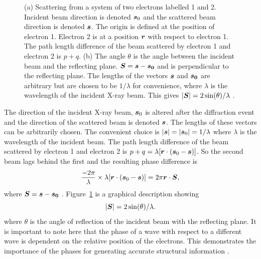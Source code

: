 \begin{figure}
\begin{subfigure}[b]{0.45\textwidth}
                        \caption{}
                        \label{fig:scattering vector}
                \end{subfigure}
                \caption[X-ray scattering from two electrons.]{(a) Scattering from a system of two electrons labelled 1 and 2. Incident beam direction is denoted $\boldsymbol{s}_0$ and the scattered beam direction is denoted $\boldsymbol{s}$.
                The origin is defined at the position of electron 1. Electron 2 is at a position $\boldsymbol{r}$ with respect to electron 1.
                The path length difference of the beam scattered by electron 1 and electron 2 is $p + q$.
                (b) The angle $\theta$ is the angle between the incident beam and the reflecting plane.
                $\boldsymbol{S} = \boldsymbol{s} - \boldsymbol{s_0}$ and is perpendicular to the reflecting plane.
                The lengths of the vectors $\boldsymbol{s}$ and $\boldsymbol{s_0}$ are arbitrary but are chosen to be $1/\lambda$ for convenience, where $\lambda$ is the wavelength of the incident X-ray beam.
                This gives $|\boldsymbol{S}| = 2 \sin(\theta)/\lambda$ \cite{drenth1999}.}
        		\label{fig:Scattering from two electrons}
            \end{figure}
            The direction of the incident X-ray beam, $\boldsymbol{s}_0$ is altered after the diffraction event and the direction of the scattered beam is denoted $\boldsymbol{s}$.
            The lengths of these vectors can be arbitrarily chosen.
            The convenient choice is $|\boldsymbol{s}| = |\boldsymbol{s}_0| = 1/\lambda$ where $\lambda$ is the wavelength of the incident beam.
            The path length difference of the beam scattered by electron 1 and electron 2 is $p + q = \lambda[\boldsymbol{r} \cdot (\boldsymbol{s}_0 - \boldsymbol{s})]$.
            So the second beam lags behind the first and the resulting phase difference is
            \begin{equation}
                \frac{-2 \pi}{\lambda} \times \lambda[\boldsymbol{r} \cdot (\boldsymbol{s}_0 - \boldsymbol{s})] = 2 \pi \boldsymbol{r} \cdot \boldsymbol{S},
            \end{equation}
            where $\boldsymbol{S} = \boldsymbol{s} - \boldsymbol{s_0}$ \cite{drenth1999}. Figure~\ref{fig:scattering vector} is a graphical description showing
            \begin{equation}
                |\boldsymbol{S}| = 2 \sin(\theta)/\lambda.
                \label{eq:length of vector S}
            \end{equation}
            where $\theta$ is the angle of reflection of the incident beam with the reflecting plane.
            It is important to note here that the phase of a wave with respect to a different wave is dependent on the relative position of the electrons.
            This demonstrates the importance of the phases for generating accurate structural information \cite{taylor2003phase, taylor2010}.

